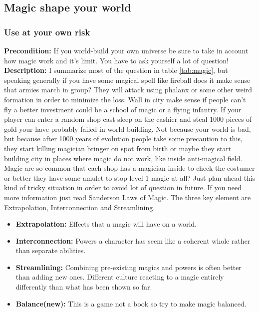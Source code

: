 \documentclass[letterpaper,10pt,twoside,twocolumn,openany]{book}
\begin{document}
\subsection{Magic shape your world}
\subsubsection{Use at your own risk}
\textbf{Precondition:} If you world-build your own universe be sure to take in account how magic work and it's limit. You have to ask yourself a lot of question!
\newline
\noindent
\textbf{Description:} I summarize most of the question in table \ref{tab:magic}, but speaking generally if you have some magical spell like fireball does it make sense that armies march in group? They will attack using phalanx or some other weird formation in order to minimize the loss. Wall in city make sense if people can't fly a better investment could be a school of magic or a flying infantry.
If your player can enter a random shop cast sleep on the cashier and steal 1000 pieces of gold your have probably failed in world building. 
Not because your world is bad, but because after 1000 years of evolution people take some precaution to this, they start killing magician bringer on spot from birth or maybe they start building city in places where magic do not work, like inside anti-magical field.
Magic are so common that each shop has a magician inside to check the costumer or better they have some amulet to stop level 1 magic at all?
Just plan ahead this kind of tricky situation in order to avoid lot of question in future. If you need more information just read Sanderson Laws of Magic\cite{magiclaw}. The three key element are Extrapolation, Interconnection and Streamlining.

\begin{itemize}
\item \textbf{Extrapolation:} Effects that a magic will have on a world.
\item \textbf{Interconnection:} Powers a character has seem like a coherent whole rather than separate abilities.
\item \textbf{Streamlining:} Combining pre-existing magics and powers is often better than adding new ones. Different culture reacting to a magic entirely differently than what has been shown so far.
\item \textbf{Balance(new):} This is a game not a book so try to make magic balanced.
\end{itemize}
\end{document}
